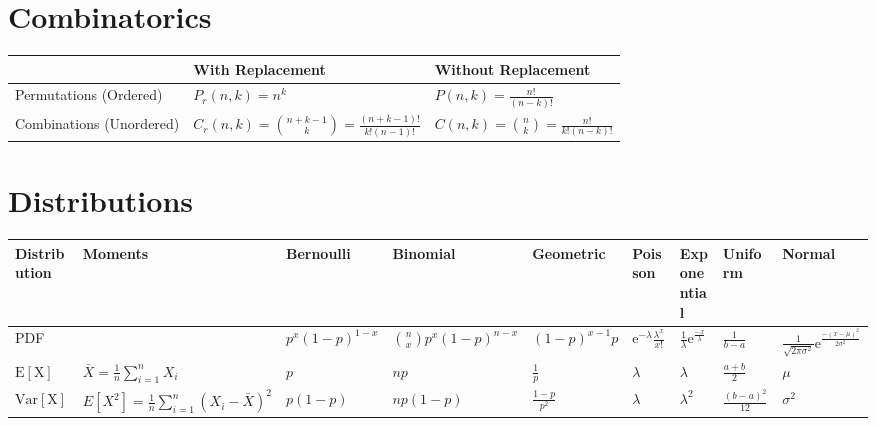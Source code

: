\documentclass[8pt]{extarticle}
\begin{document}
\section{Combinatorics}

\begin{center}
    \begin{tabular}{ | l | l | l | }
        \hline
        & With Replacement & Without Replacement \\ \hline

        Permutations (Ordered)   & $P_{r}(n,k)=n^k$              & $P(n,k)=\frac{n!}{(n-k)!}$ \\ \hline
        Combinations (Unordered) & $C_{r}(n,k)=\binom{n+k-1}{k}=\frac{(n+k-1)!}{k!(n-1)!}$ & $C(n,k)=\binom{n}{k}=\frac{n!}{k!(n-k)!}$ \\ \hline
    \end{tabular}
\end{center}

\section{Distributions}

\begin{center}
    \begin{tabular}{ | l || l || l | l | l | l || l | l | l | }
    \hline
    Distribution & Moments & Bernoulli & Binomial & Geometric & Poisson & Exponential & Uniform & Normal \\ \hline

    PDF &
        & $p^x(1-p)^{1-x}$
        & $\binom{n}{x}p^x(1-p)^{n-x}$
        & $(1-p)^{x-1}p$
        & $\mathrm{e}^{-\lambda}\frac{\lambda^x}{x!}$
        & $\frac{1}{\lambda}\mathrm{e}^{\frac{-x}{\lambda}}$
        & $\frac{1}{b-a}$
        & $\frac{1}{\sqrt{2\pi\sigma^2}}\mathrm{e}^{\frac{-(x-\mu)^2}{2\sigma^2}}$ \\ \hline

    $\mathrm{E[X]}$ & $\bar{X} = \frac{1}{n}\displaystyle\sum_{i=1}^{n} X_i$
                    & $p$
                    & $np$
                    & $\frac{1}{p}$
                    & $\lambda$
                    & $\lambda$
                    & $\frac{a+b}{2}$
                    & $\mu$ \\ \hline

    $\mathrm{Var[X]}$ & $E[X^2] = \frac{1}{n}\displaystyle\sum_{i=1}^{n} (X_i - \bar{X})^2$
                      & $p(1-p)$
                      & $np(1-p)$
                      & $\frac{1-p}{p^2}$
                      & $\lambda$
                      & $\lambda^2$
                      & $\frac{(b-a)^2}{12}$
                      & $\sigma^2$ \\ \hline
    \end{tabular}
\end{center}
\end{document}
